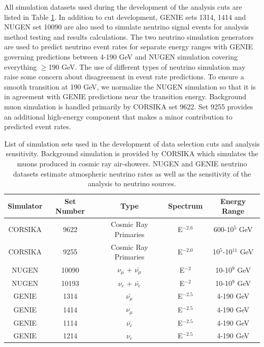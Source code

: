 \documentclass{gatech-thesis}
\begin{document}
All simulation datasets used during the development of the analysis cuts are listed in Table  \ref{tab:event_sel_sim}. In addition to cut development, GENIE sets 1314, 1414 and NUGEN set 10090 are also used to simulate neutrino signal events for analysis method testing and results calculations. The two neutrino simulation generators are used to predict neutrino event rates for separate energy ranges with GENIE governing predictions between 4-190 GeV and NUGEN simulation covering everything $\geq$190 GeV. The use of different types of neutrino simulation may raise some concern about disagreement in event rate predictions. To ensure a smooth transition at 190 GeV, we normalize the NUGEN simulation so that it is in agreement with GENIE predictions near the transition energy. Background muon simulation is handled primarily by CORSIKA set 9622. Set 9255 provides an additional high-energy component that makes a minor contribution to predicted event rates.
\begin{table}[h]
\caption[Ice Properties Systematic Datasets]{List of simulation sets used in the development of data selection cuts and analysis sensitivity. Background simulation is provided by CORSIKA which simulates the muons produced in cosmic ray air-showers. NUGEN and GENIE neutrino datasets estimate atmospheric neutrino rates as well as the sensitivity of the analysis to neutrino sources. \label{tab:event_sel_sim}}
\begin{center}
\begin{tabular}{ccccc}
\toprule
\textbf{Simulator} & \textbf{Set Number} &\textbf{Type} & \textbf{Spectrum} & \textbf{Energy Range}\\
\midrule
CORSIKA & 9622 & Cosmic Ray Primaries & E$^{-2.6}$ & 600-10$^{5}$ GeV \\
CORSIKA & 9255 & Cosmic Ray Primaries & E$^{-2.0}$ & 10$^{5}$-10$^{11}$ GeV \\
NUGEN & 10090 & $\nu_{\mu}$ + $\bar{\nu_{\mu}}$ & E$^{-2}$ & 10-10$^9$ GeV \\
NUGEN & 10193 & $\nu_{e}$ + $\bar{\nu_{e}}$ & E$^{-2}$ & 10-10$^9$ GeV \\
GENIE & 1314 & $\bar{\nu_{\mu}}$ & E$^{-2.5}$ & 4-190 GeV \\
GENIE & 1414 & $\nu_{\mu}$ & E$^{-2.5}$ & 4-190 GeV \\
GENIE & 1114 & $\bar{\nu_{e}}$ & E$^{-2.5}$ & 4-190 GeV \\
GENIE & 1214 & $\nu_{e}$ & E$^{-2.5}$ & 4-190 GeV \\
\hline
\end{tabular}
\end{center}
\end{table}
\end{document}
